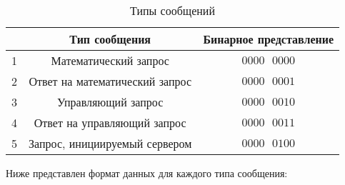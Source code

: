 \begin{table}[H]
\begin{center}
	\caption{Типы сообщений}
	\label{tab:msg-types}
	\def\tabcolsep{10pt}
	\def\arraystretch{1.23}
	\begin{tabular}{|c|c|c|}
		\hline 
		& Тип сообщения & Бинарное представление \\ 
		\hline 
		1 & Математический запрос & $0000\text{ }0000$ \\ 
		\hline 
		2 & Ответ на математический запрос & $0000\text{ }0001$ \\ 
		\hline 
		3 & Управляющий запрос & $0000\text{ }0010$ \\ 
		\hline 
		4 & Ответ на управляющий запрос & $0000\text{ }0011$ \\ 
		\hline
		5 & Запрос, инициируемый сервером & $0000\text{ }0100$ \\ 
		\hline
	\end{tabular} 
\end{center}
\end{table}

Ниже представлен формат данных для каждого типа сообщения:

